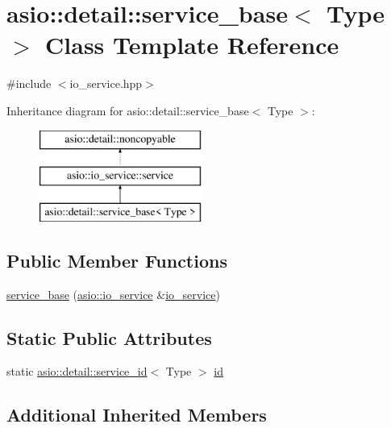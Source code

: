 \hypertarget{classasio_1_1detail_1_1service__base}{}\section{asio\+:\+:detail\+:\+:service\+\_\+base$<$ Type $>$ Class Template Reference}
\label{classasio_1_1detail_1_1service__base}


{\ttfamily \#include $<$io\+\_\+service.\+hpp$>$}

Inheritance diagram for asio\+:\+:detail\+:\+:service\+\_\+base$<$ Type $>$\+:\begin{figure}[H]
\begin{center}
\leavevmode
\includegraphics[height=3.000000cm]{classasio_1_1detail_1_1service__base}
\end{center}
\end{figure}
\subsection*{Public Member Functions}
\begin{DoxyCompactItemize}
\item 
\hyperlink{classasio_1_1detail_1_1service__base_a56364f88e64871081508d5a5571173ee}{service\+\_\+base} (\hyperlink{classasio_1_1io__service}{asio\+::io\+\_\+service} \&\hyperlink{classasio_1_1io__service}{io\+\_\+service})
\end{DoxyCompactItemize}
\subsection*{Static Public Attributes}
\begin{DoxyCompactItemize}
\item 
static \hyperlink{classasio_1_1detail_1_1service__id}{asio\+::detail\+::service\+\_\+id}$<$ Type $>$ \hyperlink{classasio_1_1detail_1_1service__base_a4df341e7693a761a9b83a79ae9b8cd4e}{id}
\end{DoxyCompactItemize}
\subsection*{Additional Inherited Members}



